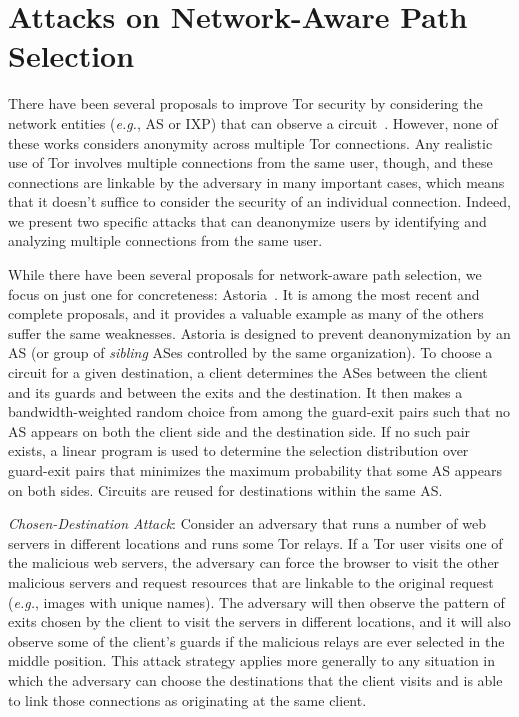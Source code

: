 \documentclass[conference]{styles/IEEEtran}
\newcommand{\eg}{\emph{e.g.}}
\begin{document}
\fi 

\section{Attacks on Network-Aware Path Selection}\label{sec:attacks}
There have been several proposals to improve Tor security by considering the network entities
(\eg{}, AS or IXP) that can observe a
circuit~\cite{denasa-pets2016,astoria-ndss2016,lastor,juen-masters,tor-as,feamster:wpes2004}.
However, none of these works considers anonymity across multiple Tor connections. Any realistic
use of Tor involves multiple connections from the same user, though, and these connections are
linkable by the adversary in many important cases, which means that it doesn't suffice to
consider the security of an individual connection. Indeed, we present two specific attacks that
can deanonymize users by identifying and analyzing multiple connections from the same user.

While there have been several proposals for network-aware path selection, we focus on just one
for concreteness: Astoria~\cite{astoria-ndss2016}. It is among the most recent and complete
proposals, and it provides a valuable example as many of the others suffer the same weaknesses.
Astoria is designed to prevent deanonymization by an AS (or group of \emph{sibling} ASes controlled
by the same organization). To choose a circuit for a given destination, a client determines the
ASes between the client and its guards and between the exits and the destination. It then makes a
bandwidth-weighted random choice from among the guard-exit pairs such that no AS appears on both the
client side and the destination side. If no such pair exists, a linear program is used to determine
the selection distribution over guard-exit pairs that minimizes the maximum probability that some
AS appears on both sides. Circuits are reused for destinations within the same AS.



\textit{Chosen-Destination Attack}: Consider an adversary that
runs a number of web servers in different locations and runs some Tor relays. If a Tor user visits
one of the malicious web servers, the adversary can force the browser to visit the other
malicious servers and request resources that are linkable to the original request (\eg{}, images
with unique names). The adversary will then observe the pattern of exits chosen by the client to
visit the servers in different locations, and it will also observe some of the client's guards if
the malicious relays are ever selected in the middle position. This attack strategy applies more
generally to any situation in which the adversary can choose the destinations that the client visits
and is able to link those connections as originating at the same client.
\end{document}

